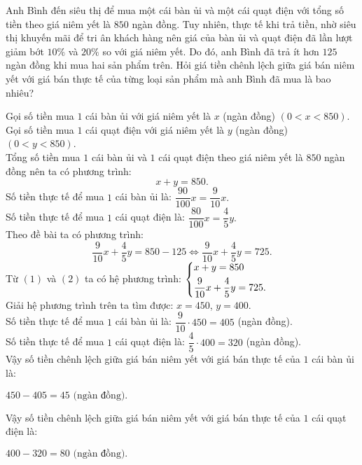 \begin{bt}%
    Anh Bình đến siêu thị để mua một cái bàn ủi và một cái quạt điện với tổng số tiền theo giá niêm yết là $850$ ngàn đồng. Tuy nhiên, thực tế khi trả tiền, nhờ siêu thị khuyến mãi để tri ân khách hàng nên giá của bàn ủi và quạt điện đã lần lượt giảm bớt $10\%$ và $20\%$ so với giá niêm yết. Do đó, anh Bình đã trả ít hơn $125$ ngàn đồng khi mua hai sản phẩm trên. Hỏi giá tiền chênh lệch giữa giá bán niêm yết với giá bán thực tế của từng loại sản phẩm mà anh Bình đã mua là bao nhiêu?  
\loigiai
    {
    Gọi số tiền mua $1$ cái bàn ủi với giá niêm yết là $x$ (ngàn đồng) $(0<x<850)$.\\
    Gọi số tiền mua $1$ cái quạt điện với giá niêm yết là $y$ (ngàn đồng) $(0<y<850)$.\\
    Tổng số tiền mua $1$ cái bàn ủi và $1$ cái quạt điện theo giá niêm yết là $850$ ngàn đồng nên ta có phương trình: 
    \[x+y=850.\tag{1}\]
    Số tiền thực tế để mua $1$ cái bàn ủi là: $\dfrac{90}{100}x=\dfrac{9}{10}x.$\\
    Số tiền thực tế để mua $1$ cái quạt điện là: $\dfrac{80}{100}x=\dfrac{4}{5}y.$\\
   Theo đề bài ta có phương trình:
\[\dfrac{9}{10}x+\dfrac{4}{5}y=850-125
    \Leftrightarrow \dfrac{9}{10}x+\dfrac{4}{5}y=725.\tag{2}\]
Từ $(1)$ và $(2)$ ta có hệ phương trình: $\left\{\begin{aligned}&x+y=850\\&\dfrac{9}{10}x+\dfrac{4}{5}y=725.\end{aligned}\right.$\\
    Giải hệ phương trình trên ta tìm được: $x=450$, $y=400.$\\
    Số tiền thực tế để mua $1$ cái bàn ủi là: $\dfrac{9}{10}\cdot450=405$ (ngàn đồng).\\
    Số tiền thực tế để mua $1$ cái quạt điện là: $\dfrac{4}{5}\cdot400=320$ (ngàn đồng).\\
    Vậy số tiền chênh lệch giữa giá bán niêm yết với giá bán thực tế của $1$ cái bàn ủi là:
    \begin{center}
    	$450-405=45 \text{ (ngàn đồng).}$
    \end{center}
    Vậy số tiền chênh lệch giữa giá bán niêm yết với giá bán thực tế của $1$ cái quạt điện là:
    \begin{center}
    	$400-320=80 \text{ (ngàn đồng).}$ 
    \end{center}
	}
\end{bt}	


